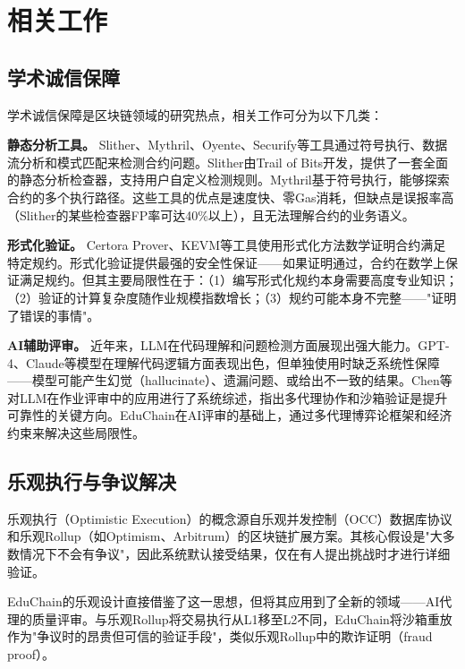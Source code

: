 \documentclass[10.5pt,compsoc]{CjC}
\begin{document}
\section{相关工作}

\subsection{学术诚信保障}

学术诚信保障是区块链领域的研究热点，相关工作可分为以下几类：

\textbf{静态分析工具。} Slither\cite{feist2019}、Mythril\cite{mueller2018}、Oyente\cite{luu2016}、Securify\cite{tsankov2018}等工具通过符号执行、数据流分析和模式匹配来检测合约问题。Slither由Trail of Bits开发，提供了一套全面的静态分析检查器，支持用户自定义检测规则。Mythril基于符号执行，能够探索合约的多个执行路径。这些工具的优点是速度快、零Gas消耗，但缺点是误报率高（Slither的某些检查器FP率可达40\%以上），且无法理解合约的业务语义。

\textbf{形式化验证。} Certora Prover\cite{certora2023}、KEVM\cite{hildenbrandt2018}等工具使用形式化方法数学证明合约满足特定规约。形式化验证提供最强的安全性保证——如果证明通过，合约在数学上保证满足规约。但其主要局限性在于：（1）编写形式化规约本身需要高度专业知识；（2）验证的计算复杂度随作业规模指数增长；（3）规约可能本身不完整——"证明了错误的事情"。

\textbf{AI辅助评审。} 近年来，LLM在代码理解和问题检测方面展现出强大能力。GPT-4\cite{openai2024}、Claude\cite{anthropic2024}等模型在理解代码逻辑方面表现出色，但单独使用时缺乏系统性保障——模型可能产生幻觉（hallucinate）、遗漏问题、或给出不一致的结果。Chen等\cite{chen2024smart}对LLM在作业评审中的应用进行了系统综述，指出多代理协作和沙箱验证是提升可靠性的关键方向。EduChain在AI评审的基础上，通过多代理博弈论框架和经济约束来解决这些局限性。

\subsection{乐观执行与争议解决}

乐观执行（Optimistic Execution）的概念源自乐观并发控制（OCC）数据库协议\cite{kung1981}和乐观Rollup（如Optimism\cite{optimism2023}、Arbitrum\cite{arbitrum2023}）的区块链扩展方案。其核心假设是"大多数情况下不会有争议"，因此系统默认接受结果，仅在有人提出挑战时才进行详细验证。

EduChain的乐观设计直接借鉴了这一思想，但将其应用到了全新的领域——AI代理的质量评审。与乐观Rollup将交易执行从L1移至L2不同，EduChain将沙箱重放作为"争议时的昂贵但可信的验证手段"，类似乐观Rollup中的欺诈证明（fraud proof）。
\end{document}
